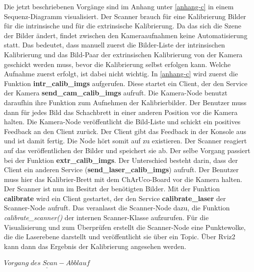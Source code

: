 		Die jetzt beschriebenen Vorgänge sind im Anhang unter \ref{anhang-c} in einem Sequenz-Diagramm visualisiert. \newline
		Der Scanner brauch für eine Kalibrierung Bilder für die intrinsische und für die extrinsische Kalibrierung. Da das sich die Szene der Bilder ändert, findet zwischen den Kameraaufnahmen keine Automatisierung statt. Das bedeutet, dass manuell zuerst die Bilder-Liste der intrinsischen Kalibrierung und das Bild-Paar der extrinsischen Kalibrierung von der Kamera geschickt werden muss, bevor die Kalibrierung selbst erfolgen kann. Welche Aufnahme zuerst erfolgt, ist dabei nicht wichtig. In \ref{anhang-c} wird zuerst die Funktion \textbf{intr\_calib\_imgs} aufgerufen. Diese startet ein Client, der den Service der Kamera \textbf{send\_cam\_calib\_imgs} aufruft. Die Kamera-Node benutzt daraufhin ihre Funktion zum Aufnehmen der Kalibrierbilder. Der Benutzer muss dann für jedes Bild das Schachbrett in einer anderen Position vor die Kamera halten. Die Kamera-Node veröffentlicht die Bild-Liste und schickt ein positives Feedback an den Client zurück. Der Client gibt das Feedback in der Konsole aus und ist damit fertig. Die Node hört somit auf zu existieren. Der Scanner reagiert auf das veröffentlichen der Bilder und speichert sie ab. \newline
		Der selbe Vorgang passiert bei der Funktion \textbf{extr\_calib\_imgs}. Der Unterschied besteht darin, dass der Client ein anderen Service (\textbf{send\_laser\_calib\_imgs}) aufruft. Der Benutzer muss hier das Kalibrier-Brett mit dem ChArUco-Board vor die Kamera halten. \newline
		Der Scanner ist nun im Besitzt der benötigten Bilder. Mit der Funktion \textbf{calibrate} wird ein Client gestartet, der den Service \textbf{calibrate\_laser} der Scanner-Node aufruft. Das veranlasst die Scanner-Node dazu, die Funktion \textit{calibrate\_scanner()} der internen Scanner-Klasse aufzurufen. Für die Visualisierung und zum Überprüfen erstellt die Scanner-Node eine Punktewolke, die die Laserebene darstellt und veröffentlicht sie über ein Topic. Über Rviz2 kann dann das Ergebnis der Kalibrierung angesehen werden.
		
		$\underline{Vorgang\;des\;Scan-Abblauf}$
		
